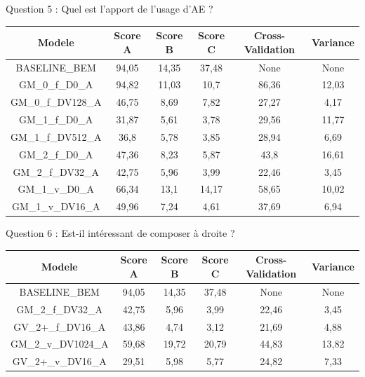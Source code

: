 \documentclass[
11pt,notheorems,hyperref={pdfauthor=whatever}
]{beamer}
\begin{document}
\begin{frame}{Question 5 : Quel est l’apport de l’usage d’AE ?}
    \begin{tabular}{|c|c|c|c|c|c|}
                \hline
                \textbf{Modele} & \textbf{Score A} & \textbf{Score B} & \textbf{Score C} & \textbf{Cross-Validation} & \textbf{Variance} \\
                \hline
                BASELINE\_BEM &94,05 & 14,35 & 37,48 & None  & None   \\
                \hline    
                GM\_0\_f\_D0\_A & 94,82 & 11,03 & 10,7 & 86,36 & 12,03  \\ 
                GM\_0\_f\_DV128\_A & 46,75 & 8,69 & 7,82 & 27,27 & 4,17 \\ 
                \hline
                GM\_1\_f\_D0\_A & 31,87 & 5,61 & 3,78 & 29,56 & 11,77   \\ 
                GM\_1\_f\_DV512\_A & 36,8 & 5,78 & 3,85 & 28,94 & 6,69  \\ 
                \hline
                GM\_2\_f\_D0\_A & 47,36 & 8,23 & 5,87 & 43,8 & 16,61  \\
                GM\_2\_f\_DV32\_A & 42,75 & 5,96 & 3,99 & 22,46 & 3,45 \\ 
                \hline
                GM\_1\_v\_D0\_A & 66,34 & 13,1 & 14,17 & 58,65 & 10,02  \\ 
                GM\_1\_v\_DV16\_A & 49,96 & 7,24 & 4,61 & 37,69 & 6,94  \\ 
                \hline
    \end{tabular}
\end{frame}

\begin{frame}{Question 6 : Est-il intéressant de composer à droite ?}
        \begin{tabular}{|c|c|c|c|c|c|}
                \hline
                \textbf{Modele} & \textbf{Score A} & \textbf{Score B} & \textbf{Score C} & \textbf{Cross-Validation} & \textbf{Variance} \\
                \hline
                BASELINE\_BEM &94,05 & 14,35 & 37,48 & None  & None   \\
                \hline    
                GM\_2\_f\_DV32\_A & 42,75 & 5,96 & 3,99 & 22,46 & 3,45 \\
                GV\_2+\_f\_DV16\_A & 43,86 & 4,74 & 3,12 & 21,69 & 4,88 \\
                \hline
                GM\_2\_v\_DV1024\_A & 59,68 & 19,72 & 20,79 & 44,83 & 13,82 \\
                GV\_2+\_v\_DV16\_A & 29,51 & 5,98 & 5,77 & 24,82 & 7,33 \\
                \hline
    \end{tabular}
\end{frame}
\end{document}
